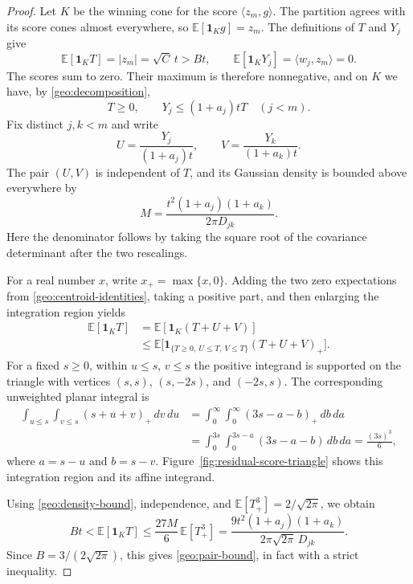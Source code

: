 \begin{proof}
Let $K$ be the winning cone for the score $\langle z_m,g\rangle$.
The partition agrees with its score cones almost everywhere, so
$\mathbb E[\mathbf 1_Kg]=z_m$.  The definitions of $T$ and $Y_j$ give
\begin{equation}
 \mathbb E[\mathbf 1_KT]=|z_m|=\sqrt C\,t>Bt,
 \qquad
 \mathbb E[\mathbf 1_KY_j]=\langle w_j,z_m\rangle=0.
 \label{geo:centroid-identities}
\end{equation}
The scores sum to zero.  Their maximum is therefore nonnegative, and
on $K$ we have, by \eqref{geo:decomposition},
\[
 T\ge0,\qquad Y_j\le(1+a_j)tT\quad(j<m).
\]
Fix distinct $j,k<m$ and write
\[
 U=\frac{Y_j}{(1+a_j)t},\qquad
 V=\frac{Y_k}{(1+a_k)t}.
\]
The pair $(U,V)$ is independent of $T$, and its Gaussian density is
bounded above everywhere by
\begin{equation}
 M=\frac{t^2(1+a_j)(1+a_k)}{2\pi D_{jk}}.
 \label{geo:density-bound}
\end{equation}
Here the denominator follows by taking the square root of the
covariance determinant after the two rescalings.

For a real number $x$, write $x_+=\max\{x,0\}$.  Adding the two
zero expectations from \eqref{geo:centroid-identities}, taking a
positive part, and then enlarging the integration region yields
\begin{align*}
 \mathbb E[\mathbf 1_KT]
 &=\mathbb E[\mathbf 1_K(T+U+V)]\\
 &\le\mathbb E\big[
 \mathbf 1_{\{T\ge0,\ U\le T,\ V\le T\}}(T+U+V)_+\big].
\end{align*}
For a fixed $s\ge0$, within $u\le s$, $v\le s$ the positive integrand
is supported on the triangle with vertices $(s,s)$, $(s,-2s)$, and
$(-2s,s)$. The corresponding unweighted planar integral is
\begin{align*}
 \int_{u\le s}\int_{v\le s}(s+u+v)_+\,dv\,du
 &=\int_0^\infty\int_0^\infty(3s-a-b)_+\,db\,da\\
 &=\int_0^{3s}\int_0^{3s-a}(3s-a-b)\,db\,da
 =\frac{(3s)^3}{6},
\end{align*}
where $a=s-u$ and $b=s-v$. Figure~\ref{fig:residual-score-triangle}
shows this integration region and its affine integrand.

Using \eqref{geo:density-bound},
independence, and $\mathbb E[T_+^3]=2/\sqrt{2\pi}$, we obtain
\[
 Bt<\mathbb E[\mathbf 1_KT]
 \le \frac{27M}{6}\,\mathbb E[T_+^3]
 =\frac{9t^2(1+a_j)(1+a_k)}{2\pi\sqrt{2\pi}\,D_{jk}}.
\]
Since $B=3/(2\sqrt{2\pi})$, this gives
\eqref{geo:pair-bound}, in fact with a strict inequality.
\end{proof}

